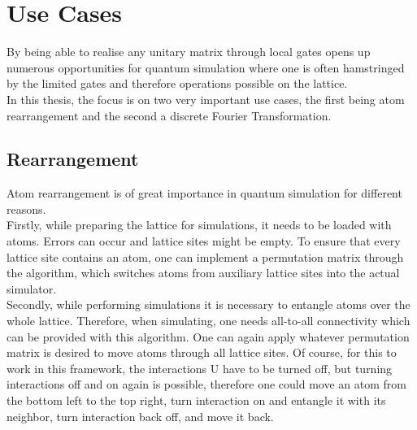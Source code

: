 \section{Use Cases}
By being able to realise any unitary matrix through local gates opens up numerous opportunities for quantum simulation where one is often hamstringed by the limited gates and therefore operations possible on the lattice. \\
In this thesis, the focus is on two very important use cases, the first being atom rearrangement and the second a discrete Fourier Transformation. \\
\subsection{Rearrangement}
Atom rearrangement is of great importance in quantum simulation for different reasons. \\
Firstly, while preparing the lattice for simulations, it needs to be loaded with atoms. Errors can occur and lattice sites might be empty. To ensure that every lattice site contains an atom, one can implement a permutation matrix through the algorithm, which switches atoms from auxiliary lattice sites into the actual simulator. \\
Secondly, while performing simulations it is necessary to entangle atoms over the whole lattice. Therefore, when simulating, one needs all-to-all connectivity which can be provided with this algorithm. One can again apply whatever permutation matrix is desired to move atoms through all lattice sites. Of course, for this to work in this framework, the interactions U have to be turned off, but turning interactions off and on again is possible, therefore one could move an atom from the bottom left to the top right, turn interaction on and entangle it with its neighbor, turn interaction back off, and move it back.

